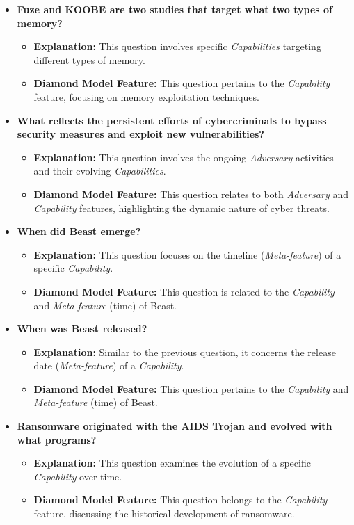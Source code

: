 \documentclass{article}
\begin{document}
\begin{itemize}
    \item \textbf{Fuze and KOOBE are two studies that target what two types of memory?}
    \begin{itemize}
        \item \textbf{Explanation:} This question involves specific \textit{Capabilities} targeting different types of memory.
        \item \textbf{Diamond Model Feature:} This question pertains to the \textit{Capability} feature, focusing on memory exploitation techniques.
    \end{itemize}

    \item \textbf{What reflects the persistent efforts of cybercriminals to bypass security measures and exploit new vulnerabilities?}
    \begin{itemize}
        \item \textbf{Explanation:} This question involves the ongoing \textit{Adversary} activities and their evolving \textit{Capabilities}.
        \item \textbf{Diamond Model Feature:} This question relates to both \textit{Adversary} and \textit{Capability} features, highlighting the dynamic nature of cyber threats.
    \end{itemize}

    \item \textbf{When did Beast emerge?}
    \begin{itemize}
        \item \textbf{Explanation:} This question focuses on the timeline (\textit{Meta-feature}) of a specific \textit{Capability}.
        \item \textbf{Diamond Model Feature:} This question is related to the \textit{Capability} and \textit{Meta-feature} (time) of Beast.
    \end{itemize}

    \item \textbf{When was Beast released?}
    \begin{itemize}
        \item \textbf{Explanation:} Similar to the previous question, it concerns the release date (\textit{Meta-feature}) of a \textit{Capability}.
        \item \textbf{Diamond Model Feature:} This question pertains to the \textit{Capability} and \textit{Meta-feature} (time) of Beast.
    \end{itemize}

    \item \textbf{Ransomware originated with the AIDS Trojan and evolved with what programs?}
    \begin{itemize}
        \item \textbf{Explanation:} This question examines the evolution of a specific \textit{Capability} over time.
        \item \textbf{Diamond Model Feature:} This question belongs to the \textit{Capability} feature, discussing the historical development of ransomware.
    \end{itemize}


\end{itemize}
\end{document}
